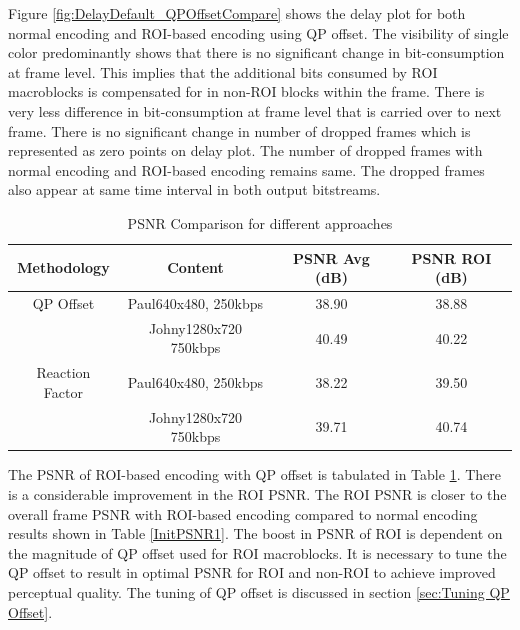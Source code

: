 \documentclass[11pt]{article} %
\begin{document}
 Figure \ref{fig:DelayDefault_QPOffsetCompare} shows the delay plot for both normal encoding and ROI-based encoding using QP offset. The visibility of single color predominantly shows that there is no significant change in bit-consumption at frame level. This implies that the additional bits consumed by ROI macroblocks is compensated for in non-ROI blocks within the frame. There is very less difference in bit-consumption at frame level that is carried over to next frame. There is no significant change in number of dropped frames which is represented as zero points on delay plot. The number of dropped frames with normal encoding and ROI-based encoding remains same. The dropped frames also appear at same time interval in both output bitstreams.
 
\begin{table} [h!]
\centering
\begin{tabular}{ |c|c|c|c| }
 \hline
Methodology & Content & PSNR Avg (dB) & PSNR ROI (dB) \\
 \hline 
QP Offset & Paul640x480, 250kbps & 38.90 & 38.88 \\ 
 & Johny1280x720 750kbps & 40.49 & 40.22 \\  
 \hline
Reaction Factor & Paul640x480, 250kbps & 38.22 & 39.50 \\ 
 & Johny1280x720 750kbps & 39.71 & 40.74 \\  
 \hline
\end{tabular}
 \caption{PSNR Comparison for different approaches}
 \label{AllPSNR1}
\end{table}

The PSNR of ROI-based encoding with QP offset is tabulated in Table \ref{AllPSNR1}. There is a considerable improvement in the ROI PSNR. The ROI PSNR is closer to the overall frame PSNR with ROI-based encoding compared to normal encoding results shown in Table \ref{InitPSNR1}. The boost in PSNR of ROI is dependent on the magnitude of QP offset used for ROI macroblocks. It is necessary to tune the QP offset to result in optimal PSNR for ROI and non-ROI to achieve improved perceptual quality. The tuning of QP offset is discussed in section \ref{sec:Tuning QP Offset}.
\end{document}
